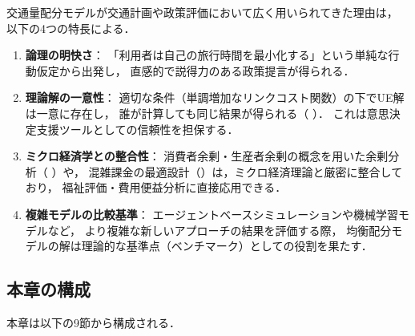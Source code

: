 交通量配分モデルが交通計画や政策評価において広く用いられてきた理由は，
以下の4つの特長による\cite{土木学会1998}．

\begin{enumerate}
  \item \textbf{論理の明快さ}：
    「利用者は自己の旅行時間を最小化する」という単純な行動仮定から出発し，
    直感的で説得力のある政策提言が得られる．

  \item \textbf{理論解の一意性}：
    適切な条件（単調増加なリンクコスト関数）の下でUE解は一意に存在し，
    誰が計算しても同じ結果が得られる（ ）．
    これは意思決定支援ツールとしての信頼性を担保する．

  \item \textbf{ミクロ経済学との整合性}：
    消費者余剰・生産者余剰の概念を用いた余剰分析（ ）や，
    混雑課金の最適設計（）は，ミクロ経済理論と厳密に整合しており，
    福祉評価・費用便益分析に直接応用できる．

  \item \textbf{複雑モデルの比較基準}：
    エージェントベースシミュレーションや機械学習モデルなど，
    より複雑な新しいアプローチの結果を評価する際，
    均衡配分モデルの解は理論的な基準点（ベンチマーク）としての役割を果たす．
\end{enumerate}

\subsection*{本章の構成}

本章は以下の9節から構成される．

